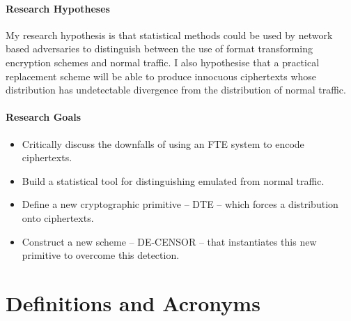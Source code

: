 \documentclass[ %
                    author={Samuel Russell},
                supervisor={Prof. Bogdan Warinschi},
                    degree={MEng},
                     title={Innocuous Ciphertexts},
                  subtitle={The DE-CENSOR Scheme},
                      type={research},
                      year={2018} ]{dissertation}
\begin{document}
\subsubsection{Research Hypotheses}

My research hypothesis is that statistical methods could be used by network based adversaries to distinguish between the use of format transforming encryption schemes and normal traffic. I also hypothesise that a practical replacement scheme will be able to produce innocuous ciphertexts whose distribution has undetectable divergence from the distribution of normal traffic.

\subsubsection{Research Goals}

\begin{itemize}
\item Critically discuss the downfalls of using an FTE system to encode ciphertexts.
\item Build a statistical tool for distinguishing emulated from normal traffic.
\item Define a new cryptographic primitive -- DTE -- which forces a distribution onto ciphertexts.
\item Construct a new scheme -- DE-CENSOR -- that instantiates this new primitive to overcome this detection.
\end{itemize}


\chapter*{Definitions and Acronyms}

\vspace{1cm} 
\end{document}
